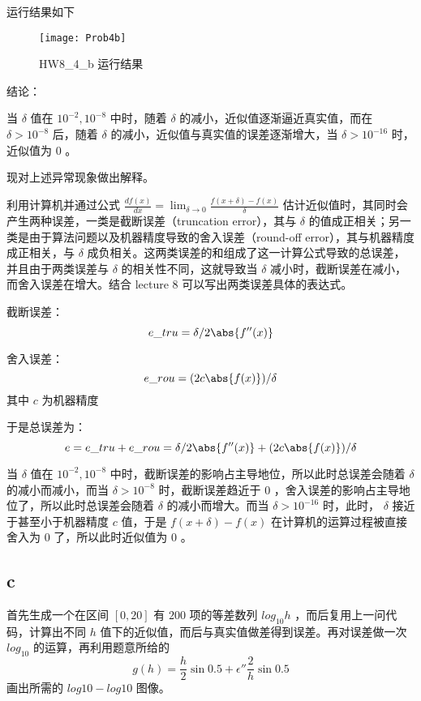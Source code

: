 \documentclass[UTF8]{ctexart}
\begin{document}
    运行结果如下
    \begin{figure}[h]
        \centering
        \texttt{[image: Prob4b]}
        \caption{HW8\_4\_b 运行结果}\label{fig:figure4.2}
    \end{figure}

    \newpage
    结论：

    当 \(\delta\) 值在 \(10^{-2}, 10^{-8} \) 中时，随着 \(\delta\) 的减小，近似值逐渐逼近真实值，而在 \(\delta > 10^{-8}\) 后，随着 \(\delta\) 的减小，近似值与真实值的误差逐渐增大，当 \(\delta > 10^{-16}\) 时，近似值为 \(0\) 。

    现对上述异常现象做出解释。

    利用计算机并通过公式 \(\frac{df(x)}{dx} = \lim_{\delta \rightarrow 0}{\frac{f(x + \delta)-f(x)}{\delta}}\) 估计近似值时，其同时会产生两种误差，一类是截断误差（truncation error），其与 \(\delta\) 的值成正相关；另一类是由于算法问题以及机器精度导致的舍入误差（round-off error），其与机器精度成正相关，与 \(\delta\) 成负相关。这两类误差的和组成了这一计算公式导致的总误差，并且由于两类误差与 \(\delta\) 的相关性不同，这就导致当 \(\delta\) 减小时，截断误差在减小，而舍入误差在增大。结合 lecture 8 可以写出两类误差具体的表达式。

    截断误差：
    \begin{equation*}
        e\_tru = \delta / 2 \abs{f''(x)}
    \end{equation*}

    舍入误差：
    \begin{equation*}
        e\_rou = (2c \abs{f(x)}) / \delta
    \end{equation*}
    其中 \(c\) 为机器精度

    于是总误差为：
    \begin{equation*}
        e = e\_tru + e\_rou = \delta / 2 \abs{f''(x)} + (2c \abs{f(x)}) / \delta
    \end{equation*}

    当 \(\delta\) 值在 \(10^{-2},10^{-8}\) 中时，截断误差的影响占主导地位，所以此时总误差会随着 \(\delta\) 的减小而减小，而当 \(\delta > 10^{-8}\) 时，截断误差趋近于 \(0\) ，舍入误差的影响占主导地位了，所以此时总误差会随着 \(\delta\) 的减小而增大。而当 \(\delta > 10^{-16}\) 时，此时， \(\delta\) 接近于甚至小于机器精度 \(c\) 值，于是 \(f(x + \delta) - f(x)\) 在计算机的运算过程被直接舍入为 \(0\) 了，所以此时近似值为 \(0\) 。

    \subsection{c}\label{subsec:4.3}
    首先生成一个在区间 \([0, 20]\) 有 \(200\) 项的等差数列 \(log_{10}{h}\) ，而后复用上一问代码，计算出不同 \(h\) 值下的近似值，而后与真实值做差得到误差。再对误差做一次 \(log_{10}\) 的运算，再利用题意所给的
    \begin{equation*}
        g(h) = \frac{h}{2} \sin{0.5} + \epsilon'' \frac{2}{h} \sin{0.5}
    \end{equation*}
    画出所需的 \(log10-log10\) 图像。
\end{document}

